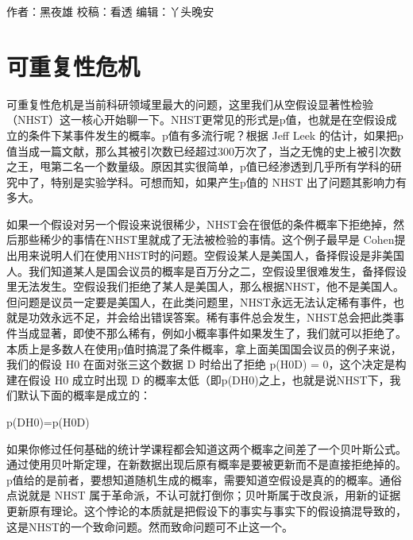\documentclass[]{book}
\begin{document}
作者：黑夜雄
校稿：看透
编辑：丫头晚安

\hypertarget{ux53efux91cdux590dux6027ux5371ux673a}{%
\section{可重复性危机}\label{ux53efux91cdux590dux6027ux5371ux673a}}

可重复性危机是当前科研领域里最大的问题，这里我们从空假设显著性检验（NHST）这一核心开始聊一下。NHST更常见的形式是p值，也就是在空假设成立的条件下某事件发生的概率。p值有多流行呢？根据 Jeff Leek 的估计，如果把p值当成一篇文献，那么其被引次数已经超过300万次了，当之无愧的史上被引次数之王，甩第二名一个数量级。原因其实很简单，p值已经渗透到几乎所有学科的研究中了，特别是实验学科。可想而知，如果产生p值的 NHST 出了问题其影响力有多大。

如果一个假设对另一个假设来说很稀少，NHST会在很低的条件概率下拒绝掉，然后那些稀少的事情在NHST里就成了无法被检验的事情。这个例子最早是 Cohen提出用来说明人们在使用NHST时的问题。空假设某人是美国人，备择假设是非美国人。我们知道某人是国会议员的概率是百万分之二，空假设里很难发生，备择假设里无法发生。空假设我们拒绝了某人是美国人，那么根据NHST，他不是美国人。但问题是议员一定要是美国人，在此类问题里，NHST永远无法认定稀有事件，也就是功效永远不足，并会给出错误答案。稀有事件总会发生，NHST总会把此类事件当成显著，即使不那么稀有，例如小概率事件如果发生了，我们就可以拒绝了。本质上是多数人在使用p值时搞混了条件概率，拿上面美国国会议员的例子来说，我们的假设 H0 在面对张三这个数据 D 时给出了拒绝 p(H0\textbar{}D) = 0，这个决定是构建在假设 H0 成立时出现 D 的概率太低（即p(D\textbar{}H0)之上，也就是说NHST下，我们默认下面的概率是成立的：

p(D\textbar{}H0)=p(H0\textbar{}D)

如果你修过任何基础的统计学课程都会知道这两个概率之间差了一个贝叶斯公式。通过使用贝叶斯定理，在新数据出现后原有概率是要被更新而不是直接拒绝掉的。p值给的是前者，要想知道随机生成的概率，需要知道空假设是真的的概率。通俗点说就是 NHST 属于革命派，不认可就打倒你；贝叶斯属于改良派，用新的证据更新原有理论。这个悖论的本质就是把假设下的事实与事实下的假设搞混导致的，这是NHST的一个致命问题。然而致命问题可不止这一个。
\end{document}
